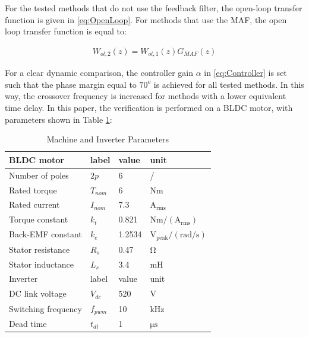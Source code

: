 \documentclass[conference]{IEEEtran}
\begin{document}
For the tested methods that do not use the feedback filter, the open-loop transfer function is given in \eqref{eq:OpenLoop}. For methods that use the MAF, the open loop transfer function is equal to:

\begin{equation}
\begin{aligned}
W_{ol,2}(z) = W_{ol,1}(z) G_{MAF}(z)
\label{eq:OpenLoop_MAF} 
\end{aligned}    
\end{equation}

For a clear dynamic comparison, the controller gain $\alpha$ in \eqref{eq:Controller} is set such that the phase margin equal to $70^o$ is achieved for all tested methods. In this way, the crossover frequency is increased for methods with a lower equivalent time delay. 
In this paper, the verification is performed on a BLDC motor, with parameters shown in Table \ref{tab:motor_param}:

\begin{table}[h!]
			  \caption{Machine and Inverter Parameters}
              \label{tab:motor_param}
              \centering
              \begin{tabular}{llll}
                           \midrule\midrule
        BLDC motor & label & value   & unit\\
        \midrule               
                  Number of poles	& $2p$ & 6 & /\\
                  Rated torque  & $T_{nom}$ & 6 &  $\mathrm{Nm}$  \\
                  Rated current  & $I_{nom}$ & 7.3 &  $\mathrm{A_{rms}}$  \\
                  Torque constant  & $k_{t}$ & 0.821 & $\mathrm{Nm/(A_{rms})}$   \\
                  Back-EMF constant  & $k_{e}$ & 1.2534 & $\mathrm{V_{peak}/(rad/s)}$   \\
                  Stator resistance  & $R_{s}$ & 0.47 & $\mathrm{\Omega}$   \\
                  Stator inductance  & $L_{s}$ & 3.4 & mH   \\
                  \midrule\midrule

        Inverter & label & value   & unit\\
        \midrule               
                  DC link voltage	& $V_{dc}$ & 520 & V \\  
                  Switching frequency  & $f_{pwm}$ & 10 & kHz   \\
                  Dead time  & $t_{dt}$ & 1 &  $\mathrm{\mu s}$  \\
                  \midrule\midrule
                                                        
              \end{tabular}
\end{table}
\end{document}
